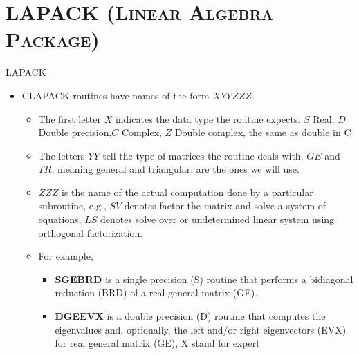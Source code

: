 \documentclass[xcolor=x11names,compress]{beamer}
\renewcommand{\(}{\begin{columns}}
\renewcommand{\)}{\end{columns}}
\newcommand{\<}[1]{\begin{column}{#1}}
\renewcommand{\>}{\end{column}}
\begin{document}
\section{\scshape  LAPACK (Linear Algebra Package)}
\begin{frame}[fragile]{LAPACK}
\begin{scriptsize}\begin{itemize} 
 \item CLAPACK routines have names of the form $XYYZZZ$. 
 \begin{itemize}
 \item The first letter $X$ indicates the data type the routine expects. $S$ Real, $D$ Double precision,$C$ Complex, $Z$ Double complex, the same as double in C
 \item The letters $YY$ tell the type of matrices the routine deals with. $GE$ and $TR$, meaning general and triangular, are the ones we will use.
 \item $ZZZ$ is the name of the actual computation done by a particular subroutine, e.g., $SV$ denotes factor the matrix and solve a system of equations, 
 $LS$ denotes solve over or undetermined linear system using orthogonal factorization.
 \item For example,
 \begin{itemize}
  \item \textbf{SGEBRD} is a single precision (S) routine that performs a bidiagonal reduction (BRD) of a real general matrix (GE). 
  \item \textbf{DGEEVX} is a double precision (D) routine that computes the eigenvalues and, optionally, the left and/or right eigenvectors (EVX) for real general matrix (GE), X stand for expert
 \end{itemize}
\end{itemize}
\end{itemize}\end{scriptsize}
\end{frame}
\end{document}
